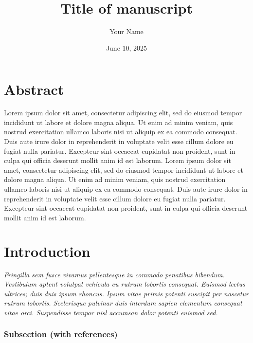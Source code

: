 \documentclass[
  a4paper,
]{scrbook}
\title{Title of manuscript}
\author{Your Name}
\date{June 10, 2025}
\renewcommand*\contentsname{Table of contents}
\newcommand\contentsname{Table of contents}
\begin{document}
\frontmatter
\maketitle

\renewcommand*\contentsname{Table of contents}
{
\setcounter{tocdepth}{1}
\tableofcontents
}

\mainmatter
\chapter{Abstract}\label{abstract}

Lorem ipsum dolor sit amet, consectetur adipiscing elit, sed do eiusmod
tempor incididunt ut labore et dolore magna aliqua. Ut enim ad minim
veniam, quis nostrud exercitation ullamco laboris nisi ut aliquip ex ea
commodo consequat. Duis aute irure dolor in reprehenderit in voluptate
velit esse cillum dolore eu fugiat nulla pariatur. Excepteur sint
occaecat cupidatat non proident, sunt in culpa qui officia deserunt
mollit anim id est laborum. Lorem ipsum dolor sit amet, consectetur
adipiscing elit, sed do eiusmod tempor incididunt ut labore et dolore
magna aliqua. Ut enim ad minim veniam, quis nostrud exercitation ullamco
laboris nisi ut aliquip ex ea commodo consequat. Duis aute irure dolor
in reprehenderit in voluptate velit esse cillum dolore eu fugiat nulla
pariatur. Excepteur sint occaecat cupidatat non proident, sunt in culpa
qui officia deserunt mollit anim id est laborum.

\chapter{Introduction}\label{introduction}

\emph{Fringilla sem fusce vivamus pellentesque in commodo penatibus
bibendum. Vestibulum aptent volutpat vehicula eu rutrum lobortis
consequat. Euismod lectus ultrices; duis duis ipsum rhoncus. Ipsum vitae
primis potenti suscipit per nascetur rutrum lobortis. Scelerisque
pulvinar duis interdum sapien elementum consequat vitae orci.
Suspendisse tempor nisl accumsan dolor potenti euismod sed.}

\subsection{Subsection (with
references)}\label{subsection-with-references}
\end{document}
